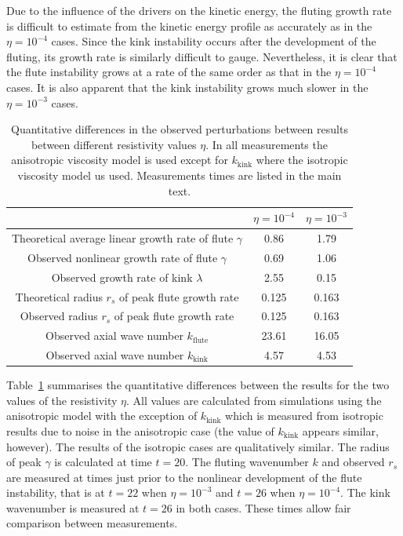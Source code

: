 \documentclass[fleqn,usenatbib]{mnras}
\begin{document}
Due to the influence of the drivers on the kinetic energy, the fluting growth
rate is difficult to estimate from the kinetic energy profile as accurately as
in the $\eta=10^{-4}$ cases. Since the kink instability occurs after the
development of the fluting, its growth rate is similarly difficult to gauge.
Nevertheless, it is clear that the flute instability grows at a rate of the
same order as that in the $\eta=10^{-4}$ cases. It is also apparent that the
kink instability grows much slower in the $\eta=10^{-3}$ cases.

\begin{table}
\caption{Quantitative differences in the observed perturbations between results
between different resistivity values $\eta$. In all measurements the
anisotropic viscosity model is used except for $k_\text{kink}$ where the
isotropic viscosity model us used. Measurements times are listed in the main
text.}
\centering
\begin{tabular}{ccc}
&
$\eta=10^{-4}$ &
$\eta=10^{-3}$ \\
\midrule
Theoretical average linear growth rate of flute $\gamma$ & 0.86 & 1.79  \\
Observed nonlinear growth rate of flute $\gamma$ & 0.69 & 1.06  \\
Observed growth rate of kink $\lambda$ & 2.55 & 0.15\\
\midrule
Theoretical radius $r_s$ of peak flute growth rate & 0.125 & 0.163 \\
Observed radius $r_s$ of peak flute growth rate & 0.125 & 0.163 \\
\midrule
Observed axial wave number $k_{\text{flute}}$ & 23.61 & 16.05 \\
Observed axial wave number $k_{\text{kink}}$ & 4.57 & 4.53 \\
\end{tabular}
\label{tab:kink_fluting_params}
\end{table}

Table~\ref{tab:kink_fluting_params} summarises the quantitative differences
between the results for the two values of the resistivity $\eta$. All values
are calculated from simulations using the anisotropic model with the exception
of $k_{\text{kink}}$ which is measured from isotropic results due to noise in
the anisotropic case (the value of $k_{\text{kink}}$ appears similar, however).
The results of the isotropic cases are qualitatively similar. The radius of
peak $\gamma$ is calculated at time $t=20$. The fluting wavenumber $k$ and
observed $r_s$ are measured at times just prior to the nonlinear development of
the flute instability, that is at $t=22$ when $\eta=10^{-3}$ and $t=26$ when
$\eta = 10^{-4}$. The kink wavenumber is measured at $t=26$ in both cases.
These times allow fair comparison between measurements.
\end{document}
